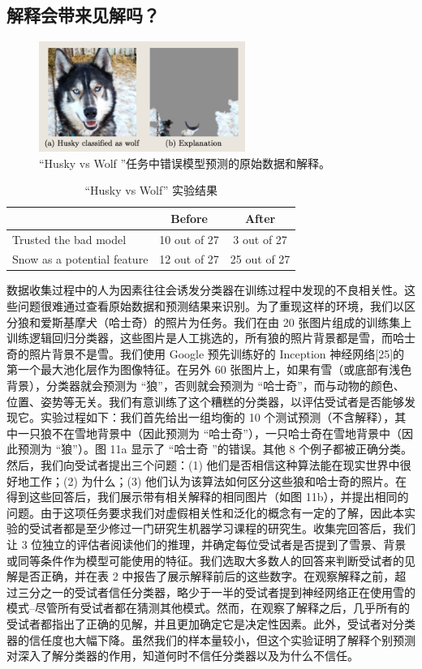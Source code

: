 \documentclass[12pt, a4paper]{ctexart} %
\begin{document}
\subsection{解释会带来见解吗？}
\begin{figure}[h]
    \centering
    \includegraphics[width=0.6\textwidth]{img/img_11.png}
    \caption{“Husky vs Wolf ”任务中错误模型预测的原始数据和解释。}
    \label{fig:img_11}
\end{figure}
\begin{table}[h]
    \centering
    \caption{“Husky vs Wolf” 实验结果}
    \begin{tabular}{l c c}
    \toprule
     & Before & After \\
    \midrule
    Trusted the bad model & 10 out of 27 & 3 out of 27 \\
    Snow as a potential feature & 12 out of 27 & 25 out of 27 \\
    \bottomrule
    \end{tabular}
    \end{table}
数据收集过程中的人为因素往往会诱发分类器在训练过程中发现的不良相关性。这些问题很难通过查看原始数据和预测结果来识别。为了重现这样的环境，我们以区分狼和爱斯基摩犬（哈士奇）的照片为任务。我们在由 20 张图片组成的训练集上训练逻辑回归分类器，这些图片是人工挑选的，所有狼的照片背景都是雪，而哈士奇的照片背景不是雪。我们使用 Google 预先训练好的 Inception 神经网络[25]的第一个最大池化层作为图像特征。在另外 60 张图片上，如果有雪（或底部有浅色背景），分类器就会预测为 “狼”，否则就会预测为 “哈士奇”，而与动物的颜色、位置、姿势等无关。我们有意训练了这个糟糕的分类器，以评估受试者是否能够发现它。实验过程如下：我们首先给出一组均衡的 10 个测试预测（不含解释），其中一只狼不在雪地背景中（因此预测为 “哈士奇”），一只哈士奇在雪地背景中（因此预测为 “狼”）。图 11a 显示了 “哈士奇 ”的错误。其他 8 个例子都被正确分类。然后，我们向受试者提出三个问题：(1) 他们是否相信这种算法能在现实世界中很好地工作；(2) 为什么；(3) 他们认为该算法如何区分这些狼和哈士奇的照片。在得到这些回答后，我们展示带有相关解释的相同图片（如图 11b），并提出相同的问题。由于这项任务要求我们对虚假相关性和泛化的概念有一定的了解，因此本实验的受试者都是至少修过一门研究生机器学习课程的研究生。收集完回答后，我们让 3 位独立的评估者阅读他们的推理，并确定每位受试者是否提到了雪景、背景或同等条件作为模型可能使用的特征。我们选取大多数人的回答来判断受试者的见解是否正确，并在表 2 中报告了展示解释前后的这些数字。在观察解释之前，超过三分之一的受试者信任分类器，略少于一半的受试者提到神经网络正在使用雪的模式--尽管所有受试者都在猜测其他模式。然而，在观察了解释之后，几乎所有的受试者都指出了正确的见解，并且更加确定它是决定性因素。此外，受试者对分类器的信任度也大幅下降。虽然我们的样本量较小，但这个实验证明了解释个别预测对深入了解分类器的作用，知道何时不信任分类器以及为什么不信任。
\end{document}
